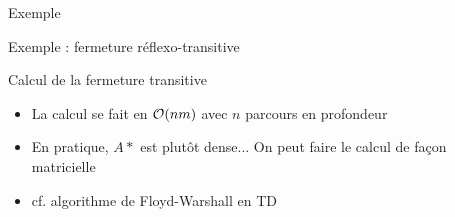 \begin{frame}{Exemple}
\begin{center}
    
\end{center}
\end{frame}

\begin{frame}{Exemple : fermeture réflexo-transitive}
\begin{center}
    
\end{center}
    \end{frame}

\begin{frame}{Calcul de la fermeture transitive}
\begin{itemize}
    \item La calcul se fait en ${\cal O}(nm)$ avec $n$ parcours en profondeur
    \item En pratique, $A*$ est plutôt dense... On peut faire le calcul de façon matricielle
    \item cf. algorithme de Floyd-Warshall en TD 
\end{itemize}
\end{frame}





